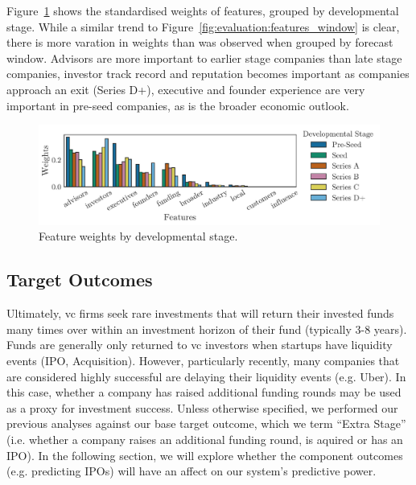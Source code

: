\documentclass[../thesis/thesis.tex]{subfiles}
\begin{document}
Figure~\ref{fig:evaluation:features_stage} shows the standardised weights of features, grouped by developmental stage. While a similar trend to Figure~\ref{fig:evaluation:features_window} is clear, there is more varation in weights than was observed when grouped by forecast window. Advisors are more important to earlier stage companies than late stage companies, investor track record and reputation becomes important as companies approach an exit (Series D+), executive and founder experience are very important in pre-seed companies, as is the broader economic outlook.

\begin{figure}[!htb]
    \centering
    \includegraphics[width=\textwidth]{../figures/evaluation/features_stage}
    \caption[Feature weights by developmental stage]{Feature weights by developmental stage.}
    \label{fig:evaluation:features_stage}
\end{figure}

\subsection{Target Outcomes}

Ultimately, \gls{vc} firms seek rare investments that will return their invested funds many times over within an investment horizon of their fund (typically 3-8 years). Funds are generally only returned to \gls{vc} investors when startups have liquidity events (IPO, Acquisition). However, particularly recently, many companies that are considered highly successful are delaying their liquidity events (e.g. Uber). In this case, whether a company has raised additional funding rounds may be used as a proxy for investment success. Unless otherwise specified, we performed our previous analyses against our base target outcome, which we term ``Extra Stage'' (i.e. whether a company raises an additional funding round, is aquired or has an IPO). In the following section, we will explore whether the component outcomes (e.g. predicting IPOs) will have an affect on our system's predictive power.
\end{document}
